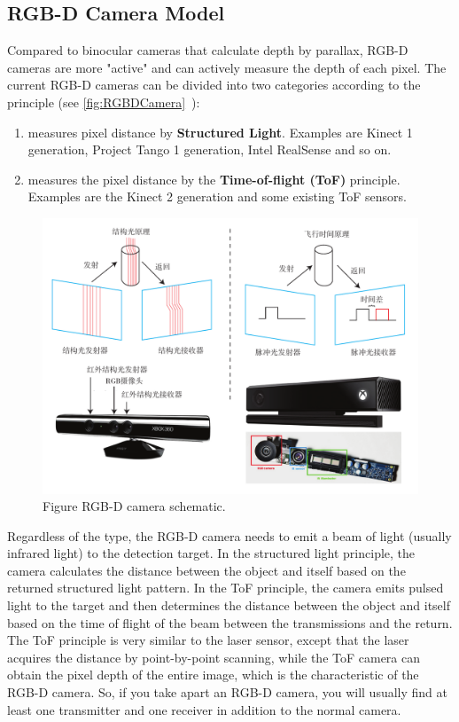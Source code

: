 \subsection{RGB-D Camera Model}

Compared to binocular cameras that calculate depth by parallax, RGB-D cameras are more "active" and can actively measure the depth of each pixel. The current RGB-D cameras can be divided into two categories according to the principle (see \autoref{fig:RGBDCamera}~):

\begin{enumerate}
	\item measures pixel distance by \textbf{Structured Light}. Examples are Kinect 1 generation, Project Tango 1 generation, Intel RealSense and so on.
	\item measures the pixel distance by the \textbf{Time-of-flight (ToF)} principle. Examples are the Kinect 2 generation and some existing ToF sensors.
\end{enumerate}

\begin{figure}[!ht]
	\centering
	\includegraphics[width=1.0 \ textwidth]{chapter05/resources/cameraModel/rgbdCamera.pdf}
	\caption{Figure RGB-D camera schematic. }
	\label{fig:RGBDCamera}
\end{figure}

Regardless of the type, the RGB-D camera needs to emit a beam of light (usually infrared light) to the detection target. In the structured light principle, the camera calculates the distance between the object and itself based on the returned structured light pattern. In the ToF principle, the camera emits pulsed light to the target and then determines the distance between the object and itself based on the time of flight of the beam between the transmissions and the return. The ToF principle is very similar to the laser sensor, except that the laser acquires the distance by point-by-point scanning, while the ToF camera can obtain the pixel depth of the entire image, which is the characteristic of the RGB-D camera. So, if you take apart an RGB-D camera, you will usually find at least one transmitter and one receiver in addition to the normal camera.

